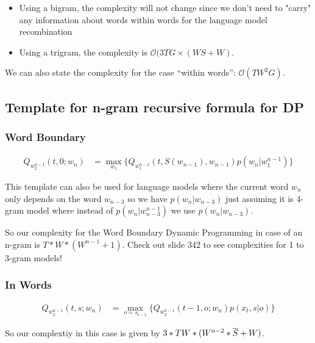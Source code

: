 \begin{itemize}
	\item Using a bigram, the complexity will not change since we don't need to "carry" any information about words 
	within words for the language model recombination
	\item Using a trigram, the complexity is $\mathcal{O}(3TG \times (WS + W)$.
\end{itemize}

We can also state the complexity for the case ``within words'': $\mathcal{O}(TW^2G)$.

\subsection*{Template for n-gram recursive formula for DP} %
\label{sub:template_for_recursive_formula_for_dp}

\subsubsection*{Word Boundary}

\begin{align*}
	Q_{w_2^{n-1}}(t,0;w_n) &= \max_{w_1} \{ Q_{w_1^{n-2}}(t,S(w_{n-1}),w_{n-1}) p(w_n|w_1^{n-1}) \} 
\end{align*}

This template can also be used for language models where the current word $w_n$ only depends on the word $w_{n-3}$ 
so we have $p(w_n|w_{n-3})$ just assuming  it is 4-gram model where instead of $p(w_n|w_{n-3}^{n-1})$ we use $p(w_n|w_{n-3})$.

So our complexity for the Word Boundary Dynamic Programming in case of an n-gram is $T*W*(W^{n-1}+1)$.
Check out slide 342 to see complexities for 1 to 3-gram models!

\subsubsection*{In Words} %
\label{ssub:in_words}

\begin{align*}
	Q_{w_2^{n-1}}(t,s;w_n) &= \max_{o=s_{t-1}} \{ Q_{w_2^{n-1}}(t-1,o;w_n) p(x_t,s|o) \} 
\end{align*}

So our complextiy in this case is given by $3*T\*W*(W^{n-2}*\overline{S}+W)$.




